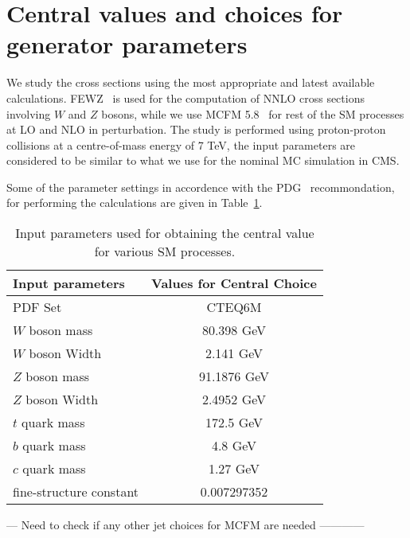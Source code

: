 \section{Central values and choices for generator parameters}
\label{sec:assumptions}

We study the cross sections using the most appropriate and latest available calculations. FEWZ~\cite{fewz} is used 
for the computation of NNLO cross sections involving $W$ and $Z$ bosons, while we use MCFM 5.8~\cite{mcfm} for rest 
of the SM processes at LO and NLO in perturbation. The study is performed using proton-proton collisions at a 
centre-of-mass energy of 7 TeV, the input parameters are considered to be similar to what we use
for the nominal MC simulation in CMS.

Some of the parameter settings in accordence with the PDG~\cite{pdg} recommondation, for performing the calculations 
are given in Table~\ref{tab:input_params}.

\vspace{0.9mm}
\begin{table}[hbt]
\begin{center}
\renewcommand{\arraystretch}{1.2}
\begin{tabular}{|l|c|}\hline
Input parameters & Values for Central Choice \\ \hline
PDF Set & CTEQ6M \\
$W$ boson mass & 80.398 GeV \\ \hline	
$W$ boson Width & 2.141 GeV \\ \hline	
$Z$ boson mass & 91.1876 GeV \\ \hline	
$Z$ boson Width & 2.4952 GeV \\ \hline	
$t$ quark mass & 172.5 GeV \\ \hline	
$b$ quark mass & 4.8 GeV \\ \hline	
$c$ quark mass & 1.27 GeV \\ \hline	
fine-structure constant &  0.007297352 \\ \hline	
\end{tabular} 
\caption{Input parameters used for obtaining the central value for various SM processes.\label{tab:input_params}}
\end{center}
\end{table}

--- Need to check if any other jet choices for MCFM are needed ------------
